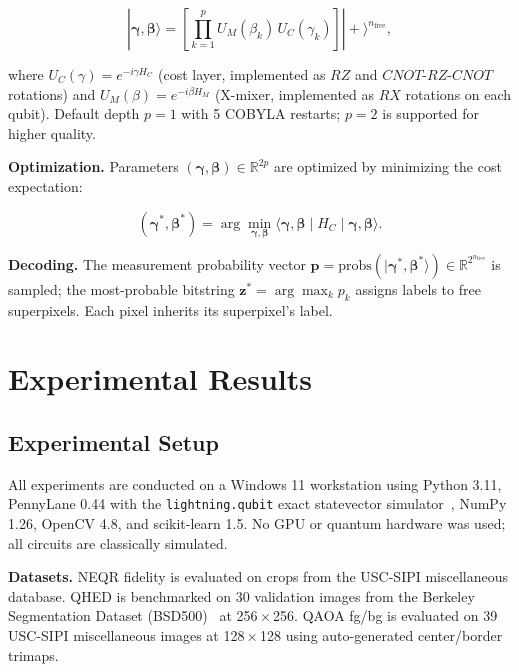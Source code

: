 \documentclass[journal]{IEEEtran}
\newcommand{\qket}[1]{|#1\rangle}
\begin{document}
\begin{equation}
  \qket{\boldsymbol{\gamma}, \boldsymbol{\beta}} =
  \left[\prod_{k=1}^{p} U_M(\beta_k)\, U_C(\gamma_k)\right] \qket{+}^{n_{\text{free}}},
  \label{eq:qaoa}
\end{equation}

where $U_C(\gamma) = e^{-i\gamma H_C}$ (cost layer, implemented as
$RZ$ and $CNOT$-$RZ$-$CNOT$ rotations) and $U_M(\beta) = e^{-i\beta H_M}$
(X-mixer, implemented as $RX$ rotations on each qubit).  Default depth
$p = 1$ with 5 COBYLA restarts; $p = 2$ is supported for higher quality.

\textbf{Optimization.}
Parameters $(\boldsymbol{\gamma}, \boldsymbol{\beta}) \in \mathbb{R}^{2p}$
are optimized by minimizing the cost expectation:

\begin{equation}
  (\boldsymbol{\gamma}^*, \boldsymbol{\beta}^*) =
  \arg\min_{\boldsymbol{\gamma}, \boldsymbol{\beta}}
  \langle \boldsymbol{\gamma}, \boldsymbol{\beta} \mid H_C \mid
  \boldsymbol{\gamma}, \boldsymbol{\beta} \rangle.
  \label{eq:opt}
\end{equation}

\textbf{Decoding.}
The measurement probability vector
$\mathbf{p} = \text{probs}(\qket{\boldsymbol{\gamma}^*, \boldsymbol{\beta}^*})
\in \mathbb{R}^{2^{n_{\text{free}}}}$ is sampled; the most-probable
bitstring $\mathbf{z}^* = \arg\max_k p_k$ assigns labels to free
superpixels.  Each pixel inherits its superpixel's label.

\section{Experimental Results}
\label{sec:experiments}

\subsection{Experimental Setup}

All experiments are conducted on a Windows 11 workstation using Python 3.11,
PennyLane 0.44 with the \texttt{lightning.qubit} exact statevector
simulator~\cite{bergholm2018pennylane}, NumPy 1.26, OpenCV 4.8, and
scikit-learn 1.5.  No GPU or quantum hardware was used; all circuits are
classically simulated.

\textbf{Datasets.}
NEQR fidelity is evaluated on crops from the USC-SIPI miscellaneous
database.  QHED is benchmarked on 30 validation images from the Berkeley
Segmentation Dataset (BSD500)~\cite{martin2001bsds} at 256\,$\times$\,256.
QAOA fg/bg is evaluated on 39 USC-SIPI miscellaneous images at
128\,$\times$\,128 using auto-generated center/border trimaps.
\end{document}
